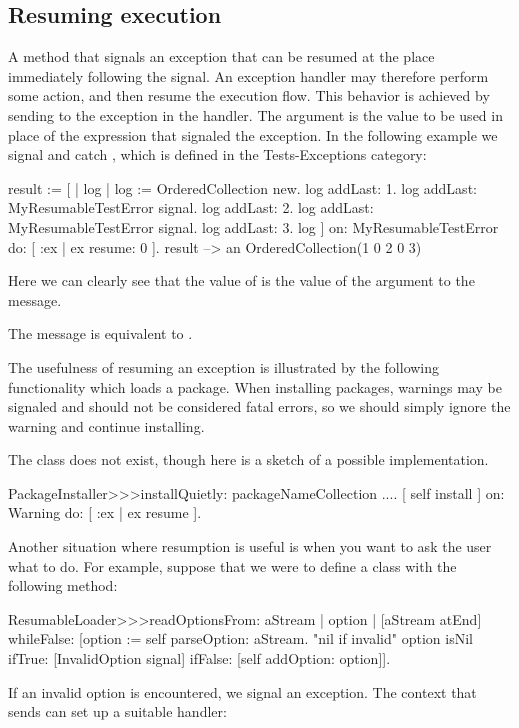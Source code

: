 \subsection{Resuming execution}

A method that signals an exception that  can be resumed at the place immediately following the signal. An exception handler may therefore perform some action, and then resume the execution flow. This behavior is achieved by sending  to the exception in the handler.
The argument is the value to be used in place of the expression that signaled the exception.
In the following example we signal and catch , which is defined in the Tests-Exceptions category:

\begin{code}{}
result := [ | log |
	log := OrderedCollection new.
	log addLast: 1.
	log addLast: MyResumableTestError signal. 
	log addLast: 2.
	log addLast: MyResumableTestError signal.
	log addLast: 3.
	log ] 
		on: MyResumableTestError 
		do: [ :ex |  ex resume: 0 ].
result --> an OrderedCollection(1 0 2 0 3)
\end{code}
Here we can clearly see that the value of  is the value of the argument to the  message.

The message  is equivalent to .

The usefulness of resuming an exception is illustrated by the following functionality which loads a package. When installing packages, warnings may be signaled and should not be considered fatal errors, so we should simply ignore the warning and continue installing. 

The class  does not exist, though here is a sketch of a possible implementation.

\begin{code}{}
PackageInstaller>>>installQuietly: packageNameCollection 
	 ....
	 [ self install ] on: Warning do: [ :ex | ex resume ]. 
\end{code}



Another situation where resumption is useful is when you want to ask the user what to do.  For example, suppose that we were to define a class  with the following method:
\begin{code}{}
ResumableLoader>>>readOptionsFrom: aStream 
	| option |
	[aStream atEnd]
		whileFalse: [option := self parseOption: aStream.
			"nil if invalid"
			option isNil
				ifTrue: [InvalidOption signal]
				ifFalse: [self addOption: option]].
\end{code}
\noindent
If an invalid option is encountered, we signal an  exception.
The context that sends  can set up a suitable handler:

